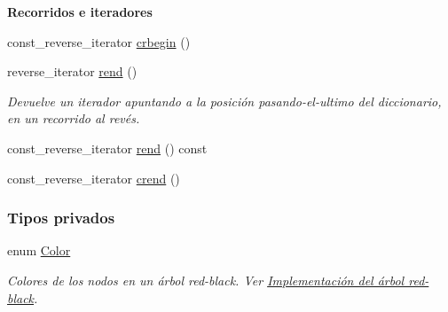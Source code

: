 \begin{Indent}{\bf \-Recorridos e iteradores}
\begin{DoxyCompactItemize}
\item 
const\-\_\-reverse\-\_\-iterator \hyperlink{classaed2_1_1map_a6ad62765a2b2e00247b9e35a7542b448_a6ad62765a2b2e00247b9e35a7542b448}{crbegin} ()
\item 
reverse\-\_\-iterator \hyperlink{classaed2_1_1map_a277f03b4f4b6b98879e4e4921081801f_a277f03b4f4b6b98879e4e4921081801f}{rend} ()
\begin{DoxyCompactList}\small\item\em \-Devuelve un iterador apuntando a la posición pasando-\/el-\/ultimo del diccionario, en un recorrido al revés. \end{DoxyCompactList}\item 
const\-\_\-reverse\-\_\-iterator \hyperlink{classaed2_1_1map_aafce6e53c53c460897613747fec89f9d_aafce6e53c53c460897613747fec89f9d}{rend} () const 
\item 
const\-\_\-reverse\-\_\-iterator \hyperlink{classaed2_1_1map_a40933b2efe1cb479de9195ea947244d1_a40933b2efe1cb479de9195ea947244d1}{crend} ()
\end{DoxyCompactItemize}
\end{Indent}
\subsubsection*{\-Tipos privados}
\begin{DoxyCompactItemize}
\item 
enum \hyperlink{classaed2_1_1map_a6d62a415a4b9d320b30cada4ebcf9f5b_a6d62a415a4b9d320b30cada4ebcf9f5b}{\-Color} 
\begin{DoxyCompactList}\small\item\em \-Colores de los nodos en un árbol red-\/black. \-Ver \hyperlink{Implementacion}{\-Implementación del árbol red-\/black}. \end{DoxyCompactList}\end{DoxyCompactItemize}
